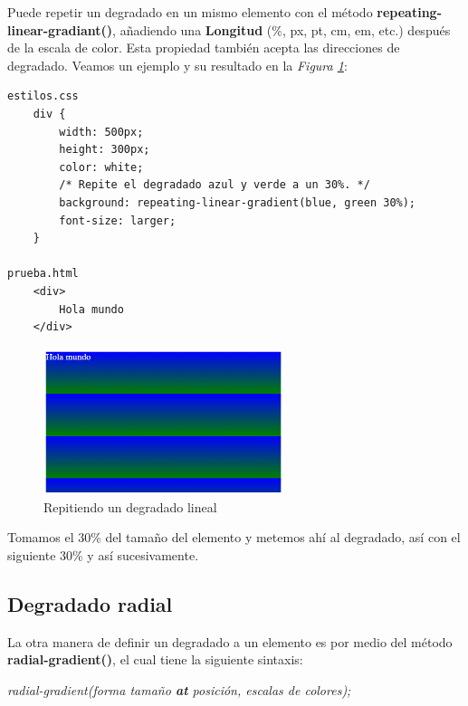 Puede repetir un degradado en un mismo elemento con el método \textbf{repeating-linear-gradiant()}, añadiendo una \textbf{Longitud} (\%, px, pt, cm, em, etc.) después de la escala de color. Esta propiedad también acepta las direcciones de degradado. Veamos un ejemplo y su resultado en la \textit{Figura \ref{fig: 45}}:
\begin{lstlisting}
estilos.css
    div {
        width: 500px; 
        height: 300px;
        color: white;
        /* Repite el degradado azul y verde a un 30%. */
        background: repeating-linear-gradient(blue, green 30%);
        font-size: larger;
    }
    
prueba.html
    <div>
        Hola mundo
    </div>
\end{lstlisting}
\begin{figure}[H]
    \centering
    \caption{Repitiendo un degradado lineal}
    \label{fig: 45}
    \includegraphics[width=7cm]{ss/linear-gradient-4.png}
\end{figure}

Tomamos el 30\% del tamaño del elemento y metemos ahí al degradado, así con el siguiente 30\% y así sucesivamente.


\subsection{Degradado radial}

La otra manera de definir un degradado a un elemento es por medio del método \textbf{radial-gradient()}, el cual tiene la siguiente sintaxis:
\begin{center}
    \textit{radial-gradient(forma tamaño \textbf{at} posición, escalas de colores);}
\end{center}

